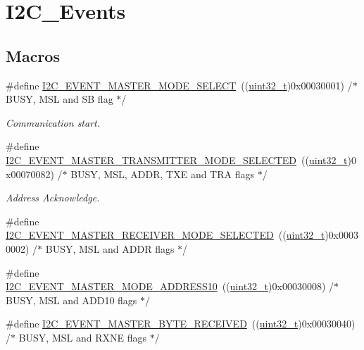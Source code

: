 \hypertarget{group___i2_c___events}{}\section{I2\+C\+\_\+\+Events}
\label{group___i2_c___events}
\subsection*{Macros}
\begin{DoxyCompactItemize}
\item 
\#define \hyperlink{group___i2_c___events_gaeef8c22ac035122b06e31b360ac7aeb3}{I2\+C\+\_\+\+E\+V\+E\+N\+T\+\_\+\+M\+A\+S\+T\+E\+R\+\_\+\+M\+O\+D\+E\+\_\+\+S\+E\+L\+E\+CT}~((\hyperlink{_p_e___types_8h_a33594304e786b158f3fb30289278f5af}{uint32\+\_\+t})0x00030001)  /$\ast$ B\+U\+S\+Y, M\+S\+L and S\+B flag $\ast$/
\begin{DoxyCompactList}\small\item\em Communication start. \end{DoxyCompactList}\item 
\#define \hyperlink{group___i2_c___events_ga2361a6e60b7dc86fb682dd06fbd3edb7}{I2\+C\+\_\+\+E\+V\+E\+N\+T\+\_\+\+M\+A\+S\+T\+E\+R\+\_\+\+T\+R\+A\+N\+S\+M\+I\+T\+T\+E\+R\+\_\+\+M\+O\+D\+E\+\_\+\+S\+E\+L\+E\+C\+T\+ED}~((\hyperlink{_p_e___types_8h_a33594304e786b158f3fb30289278f5af}{uint32\+\_\+t})0x00070082)  /$\ast$ B\+U\+S\+Y, M\+S\+L, A\+D\+D\+R, T\+X\+E and T\+R\+A flags $\ast$/
\begin{DoxyCompactList}\small\item\em Address Acknowledge. \end{DoxyCompactList}\item 
\#define \hyperlink{group___i2_c___events_gabfde82864432ddb87b6462234d542e60}{I2\+C\+\_\+\+E\+V\+E\+N\+T\+\_\+\+M\+A\+S\+T\+E\+R\+\_\+\+R\+E\+C\+E\+I\+V\+E\+R\+\_\+\+M\+O\+D\+E\+\_\+\+S\+E\+L\+E\+C\+T\+ED}~((\hyperlink{_p_e___types_8h_a33594304e786b158f3fb30289278f5af}{uint32\+\_\+t})0x00030002)  /$\ast$ B\+U\+S\+Y, M\+S\+L and A\+D\+D\+R flags $\ast$/
\item 
\#define \hyperlink{group___i2_c___events_gad04882597bbf542c6fee7a9c837fbc8c}{I2\+C\+\_\+\+E\+V\+E\+N\+T\+\_\+\+M\+A\+S\+T\+E\+R\+\_\+\+M\+O\+D\+E\+\_\+\+A\+D\+D\+R\+E\+S\+S10}~((\hyperlink{_p_e___types_8h_a33594304e786b158f3fb30289278f5af}{uint32\+\_\+t})0x00030008)  /$\ast$ B\+U\+S\+Y, M\+S\+L and A\+D\+D10 flags $\ast$/
\item 
\#define \hyperlink{group___i2_c___events_ga6bcf2ae49961e07e27cf9fdf334719e3}{I2\+C\+\_\+\+E\+V\+E\+N\+T\+\_\+\+M\+A\+S\+T\+E\+R\+\_\+\+B\+Y\+T\+E\+\_\+\+R\+E\+C\+E\+I\+V\+ED}~((\hyperlink{_p_e___types_8h_a33594304e786b158f3fb30289278f5af}{uint32\+\_\+t})0x00030040)  /$\ast$ B\+U\+S\+Y, M\+S\+L and R\+X\+N\+E flags $\ast$/

\end{DoxyCompactItemize}
